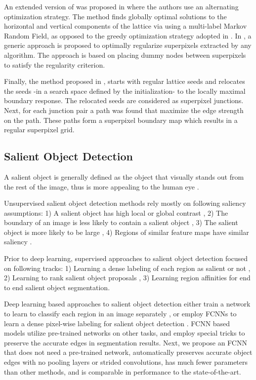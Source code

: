 \documentclass[a4paper,conference]{IEEEtran}
\begin{document}
An extended version of \cite{Moore} was proposed in \cite{Moore2} where the authors use an alternating optimization strategy. The method finds globally optimal solutions to the horizontal and vertical components of the lattice via using a multi-label Markov Random Field, as opposed to the greedy optimization strategy adopted in \cite{Moore}.
In \cite{Li1}, a generic approach is proposed to optimally regularize superpixels extracted by any algorithm. The approach is based on placing dummy nodes between superpixels to satisfy the regularity criterion.

Finally, the method proposed in \cite{Fu}, starts with regular lattice seeds and relocates the seeds -in a search space defined by the initialization- to the locally maximal boundary response. The relocated seeds are considered as superpixel junctions. Next, for each junction pair a path was found that maximize the edge strength on the path. These paths form a superpixel boundary map which results in a regular superpixel grid.

\subsection{Salient Object Detection}
A salient object is generally defined as the object that visually stands out from the rest of the image, thus is more appealing to the human eye \cite{Borji1}.

Unsupervised salient object detection methods rely mostly on following saliency assumptions: 1) A salient object has high local or global contrast \cite{Cheng1,Aytekin1}, 2) The boundary of an image is less likely to contain a salient object \cite{Li2,Aytekin2}, 3) The salient object is more likely to be large \cite{Aytekin2}, 4) Regions of similar feature maps have similar saliency \cite{Aytekin3}.

Prior to deep learning, supervised approaches to salient object detection focused on following tracks: 1) Learning a dense labeling of each region as salient or not \cite{Jiang, Li3}, 2) Learning to rank salient object proposals \cite{Aytekin4}, 3) Learning region affinities for \cite{Aytekin5} end to end salient object segmentation.

Deep learning based approaches to salient object detection either train a network to learn to classify each region in an image separately \cite{Zhao, Li4,Gayoung}, or employ FCNNs to learn a dense pixel-wise labeling for salient object detection \cite{Wang,Li5}. FCNN based models utilize pre-trained networks on other tasks, and employ special tricks to preserve the accurate edges in segmentation results. Next, we propose an FCNN that does not need a pre-trained network, automatically preserves accurate object edges with no pooling layers or strided convolutions, has much fewer parameters than other methods, and is comparable in performance to the state-of-the-art.
\end{document}
